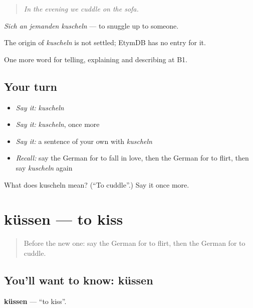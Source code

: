 \begin{quote}
\emph{In the evening we cuddle on the sofa.}
\end{quote}

\emph{Sich an jemanden kuscheln} — to snuggle up to someone.

\begin{cousinweb}
The origin of \emph{kuscheln} is not settled; EtymDB has no entry for it.
\end{cousinweb}

\begin{grammarlens}[title={What you've built}]
One more word for telling, explaining and describing at B1.
\end{grammarlens}

\subsection*{Your turn}
\begin{itemize}
\raggedright
  \item \emph{Say it:} \emph{kuscheln}
  \item \emph{Say it:} \emph{kuscheln}, once more
  \item \emph{Say it:} a sentence of your own with \emph{kuscheln}
  \item \emph{Recall:} say the German for to fall in love, then the German for to flirt, then say \emph{kuscheln} again
\end{itemize}

\begin{tcolorbox}[breakable,colback=teal!4,colframe=teal!35!black,title={Before you move on}]
What does kuscheln mean? (\textquotedblleft{}To cuddle\textquotedblright{}.) Say it once more.
\end{tcolorbox}
\section[küssen]{küssen — to kiss}

\label{lesson:GE-C492-kuessen}



\begin{quote}
Before the new one: say the German for to flirt, then the German for to cuddle.
\end{quote}

\subsection*{You'll want to know: küssen}
\textbf{küssen} — \textquotedblleft{}to kiss\textquotedblright{}.


